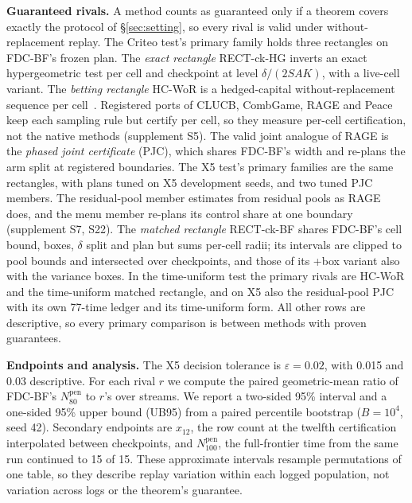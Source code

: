 \documentclass[sigconf,anonymous,review]{acmart}
\newcommand{\eps}{\varepsilon}
\newcommand{\Npen}{N_{80}^{\text{pen}}}
\begin{document}
\textbf{Guaranteed rivals.} A method counts as guaranteed only if a theorem covers exactly the protocol of \S\ref{sec:setting}, so every rival is valid under without-replacement replay. The Criteo test's primary family holds three rectangles on FDC-BF's frozen plan. The \emph{exact rectangle} RECT-ck-HG inverts an exact hypergeometric test per cell and checkpoint at level $\delta/(2SAK)$, with a live-cell variant. The \emph{betting rectangle} HC-WoR is a hedged-capital without-replacement sequence per cell~\citep{waudbysmith2020confidence,waudbysmith2024estimating}. Registered ports of CLUCB, CombGame, RAGE and Peace keep each sampling rule but certify per cell, so they measure per-cell certification, not the native methods (supplement S5). The valid joint analogue of RAGE is the \emph{phased joint certificate} (PJC), which shares FDC-BF's width and re-plans the arm split at registered boundaries. The X5 test's primary families are the same rectangles, with plans tuned on X5 development seeds, and two tuned PJC members. The residual-pool member estimates from residual pools as RAGE does, and the menu member re-plans its control share at one boundary (supplement S7, S22). The \emph{matched rectangle} RECT-ck-BF shares FDC-BF's cell bound, boxes, $\delta$ split and plan but sums per-cell radii; its intervals are clipped to pool bounds and intersected over checkpoints, and those of its +box variant also with the variance boxes. In the time-uniform test the primary rivals are HC-WoR and the time-uniform matched rectangle, and on X5 also the residual-pool PJC with its own 77-time ledger and its time-uniform form. All other rows are descriptive, so every primary comparison is between methods with proven guarantees.

\textbf{Endpoints and analysis.} The X5 decision tolerance is $\eps = 0.02$, with 0.015 and 0.03 descriptive. For each rival $r$ we compute the paired geometric-mean ratio of FDC-BF's $\Npen$ to $r$'s over streams. We report a two-sided 95\% interval and a one-sided 95\% upper bound (UB95) from a paired percentile bootstrap ($B = 10^4$, seed 42). Secondary endpoints are $x_{12}$, the row count at the twelfth certification interpolated between checkpoints, and $N_{100}^{\text{pen}}$, the full-frontier time from the same run continued to 15 of 15. These approximate intervals resample permutations of one table, so they describe replay variation within each logged population, not variation across logs or the theorem's guarantee.
\end{document}
